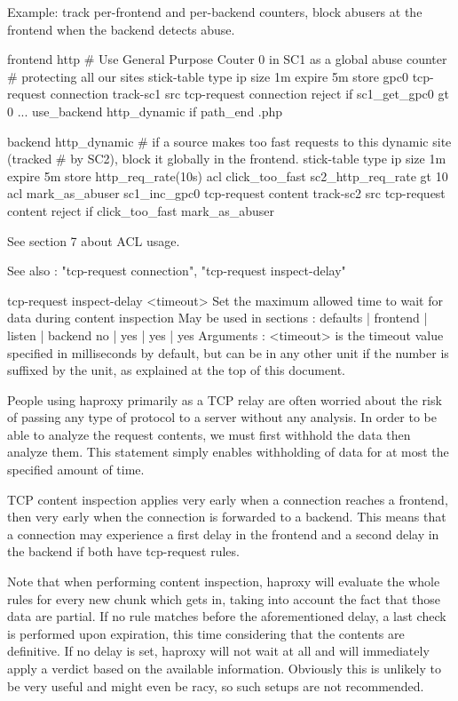   Example: track per-frontend and per-backend counters, block abusers at the
           frontend when the backend detects abuse.

        frontend http
            # Use General Purpose Couter 0 in SC1 as a global abuse counter
            # protecting all our sites
            stick-table type ip size 1m expire 5m store gpc0
            tcp-request connection track-sc1 src
            tcp-request connection reject if { sc1_get_gpc0 gt 0 }
            ...
            use_backend http_dynamic if { path_end .php }

        backend http_dynamic
            # if a source makes too fast requests to this dynamic site (tracked
            # by SC2), block it globally in the frontend.
            stick-table type ip size 1m expire 5m store http_req_rate(10s)
            acl click_too_fast sc2_http_req_rate gt 10
            acl mark_as_abuser sc1_inc_gpc0
            tcp-request content track-sc2 src
            tcp-request content reject if click_too_fast mark_as_abuser

  See section 7 about ACL usage.

  See also : "tcp-request connection", "tcp-request inspect-delay"


tcp-request inspect-delay <timeout>
  Set the maximum allowed time to wait for data during content inspection
  May be used in sections :   defaults | frontend | listen | backend
                                 no    |    yes   |   yes  |   yes
  Arguments :
    <timeout> is the timeout value specified in milliseconds by default, but
              can be in any other unit if the number is suffixed by the unit,
              as explained at the top of this document.

  People using haproxy primarily as a TCP relay are often worried about the
  risk of passing any type of protocol to a server without any analysis. In
  order to be able to analyze the request contents, we must first withhold
  the data then analyze them. This statement simply enables withholding of
  data for at most the specified amount of time.

  TCP content inspection applies very early when a connection reaches a
  frontend, then very early when the connection is forwarded to a backend. This
  means that a connection may experience a first delay in the frontend and a
  second delay in the backend if both have tcp-request rules.

  Note that when performing content inspection, haproxy will evaluate the whole
  rules for every new chunk which gets in, taking into account the fact that
  those data are partial. If no rule matches before the aforementioned delay,
  a last check is performed upon expiration, this time considering that the
  contents are definitive. If no delay is set, haproxy will not wait at all
  and will immediately apply a verdict based on the available information.
  Obviously this is unlikely to be very useful and might even be racy, so such
  setups are not recommended.

